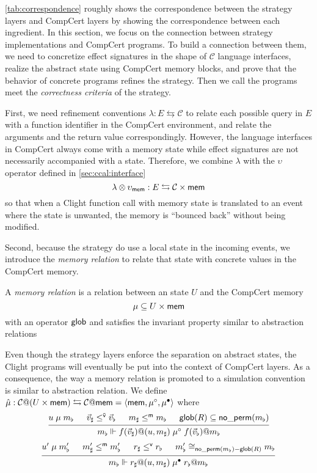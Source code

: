 \documentclass[acmsmall,review,anonymous]{acmart}\settopmatter{printfolios=true,printccs=false,printacmref=false}
\begin{document}
\autoref{tab:correspondence} roughly shows
the correspondence
between the strategy layers and CompCert layers
by showing the correspondence
between each ingredient.
In this section, we focus on
the connection between
strategy implementations and CompCert programs.
To build a connection between them,
we need to concretize effect signatures
in the shape of $\mathcal{C}$ language interfaces,
realize the abstract state
using CompCert memory blocks,
and prove that the behavior of concrete programs
refines the strategy.
Then we call the programs meet
the \emph{correctness criteria} of the strategy.

First, we need refinement conventions
$\lambda : E \leftrightarrows \mathcal{C}$
to relate each possible query in $E$
with a function identifier
in the CompCert environment,
and relate the arguments
and the return value correspondingly.
However, the language interfaces in CompCert
always come with a memory state
while effect signatures
are not necessarily accompanied
with a state.
Therefore,
we combine $\lambda$ with the $\upsilon$ operator
defined in \ref{sec:ccal:interface}
\[
  \lambda \otimes \upsilon_{ \mathsf{mem} } : E \leftrightarrows \mathcal{C}\times \mathsf{mem} 
\]
so that
when a Clight function call with memory state
is translated to an event
where the state is unwanted,
the memory is ``bounced back'' without being modified.

Second,
because the strategy do use a local state
in the incoming events,
we introduce the \emph{memory relation}
to relate that state
with concrete values in the CompCert memory.

\begin{definition}
  A \emph{memory relation} is a relation
  between an state $U$ and the CompCert memory
  \[
    \mu \subseteq U \times  \mathsf{mem} 
  \]
  with an operator $ \mathsf{glob} $
  and satisfies the invariant property
  similar to abstraction relations
\end{definition}

Even though the strategy layers
enforce the separation on abstract states,
the Clight programs will eventually be
put into the context of CompCert layers.
As a consequence,
the way a memory relation is promoted
to a simulation convention
is similar to abstraction relation.
We define
$\hat{\mu}: \mathcal{C}@(U\times \mathsf{mem} )\leftrightarrows \mathcal{C}@ \mathsf{mem} 
= \langle  \mathsf{mem} , \mu^\circ, \mu^\bullet \rangle$
where
\[
  \begin{prooftree}
    \hypo{u \mathrel{\mu} m_\flat}
    \hypo{\vec{v}_\sharp \mathrel{\le^\kw{\vec{v}}} \vec{v}_\flat}
    \hypo{m_\sharp \le^\kw{m} m_\flat}
    \hypo{\kw{glob}(R) \subseteq \kw{no\_perm}(m_\flat)}
    \infer4
    {m_\flat \Vdash
      f(\vec{v}_\sharp)@(u, m_\sharp) \mathrel{\mu^\que}
      f(\vec{v}_\flat)@m_\flat}
  \end{prooftree}
\]
\[
  \begin{prooftree}
    \hypo{u' \mathrel{\mu} m'_\flat}
    \hypo{m'_\sharp \mathrel{\le^\kw{m}} m'_\flat}
    \hypo{r_\sharp \mathrel{\le^\kw{v}} r_\flat}
    \hypo{m'_\flat \cong_{\kw{no\_perm}(m_\flat) - \kw{glob}(R)} m_\flat}
    \infer4
    {m_\flat \Vdash
      r_\sharp @ (u, m_\sharp) \mathrel{\mu^\ans}r_\flat @ m_\flat}
  \end{prooftree}
\]
\end{document}

